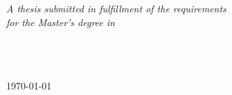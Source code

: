 \documentclass[
12pt, %
oneside, %
english, %
singlespacing, %
liststotoc, %
headsepline, %
]{MastersDoctoralThesis} %
\begin{document}
\begin{titlepage}
\begin{center}
\vfill

\large \textit{A thesis submitted in fulfillment of the requirements\\ for the Master's degree in \degreename}\\[0.3cm] %
\textit{}\\[0.4cm]
\deptname\\  %
\facname     %
\\[1cm]
 
\vfill

{\large \today}\\[4cm] %

\vfill
\end{center}
\end{titlepage}
\end{document}
